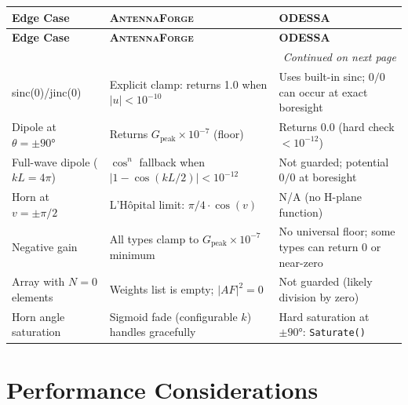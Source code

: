 \documentclass[11pt,a4paper]{article}
\newcommand{\AF}{\textsc{AntennaForge}}
\newcommand{\OD}{\textsc{ODESSA}}
\begin{document}
\begin{longtable}{p{3.5cm} p{5.5cm} p{5.5cm}}
\toprule
\textbf{Edge Case} & \textbf{\AF{}} & \textbf{\OD{}} \\
\midrule
\endfirsthead
\toprule
\textbf{Edge Case} & \textbf{\AF{}} & \textbf{\OD{}} \\
\midrule
\endhead
\midrule
\multicolumn{3}{r}{\itshape Continued on next page} \\
\bottomrule
\endfoot
\bottomrule
\endlastfoot

sinc(0)/jinc(0) &
  Explicit clamp: returns 1.0 when $|u| < 10^{-10}$ &
  Uses built-in sinc; $0/0$ can occur at exact boresight \\

Dipole at $\theta = \pm 90°$ &
  Returns $G_\text{peak} \times 10^{-7}$ (floor) &
  Returns 0.0 (hard check $< 10^{-12}$) \\

Full-wave dipole ($kL = 4\pi$) &
  $\cos^n$ fallback when $|1 - \cos(kL/2)| < 10^{-12}$ &
  Not guarded; potential $0/0$ at boresight \\

Horn at $v = \pm\pi/2$ &
  L'H\^{o}pital limit: $\pi/4 \cdot \cos(v)$ &
  N/A (no H-plane function) \\

Negative gain &
  All types clamp to $G_\text{peak} \times 10^{-7}$ minimum &
  No universal floor; some types can return 0 or near-zero \\

Array with $N = 0$ elements &
  Weights list is empty; $|AF|^2 = 0$ &
  Not guarded (likely division by zero) \\

Horn angle saturation &
  Sigmoid fade (configurable $k$) handles gracefully &
  Hard saturation at $\pm 90°$: \texttt{Saturate()} \\
\end{longtable}

\section{Performance Considerations}
\label{sec:perf}
\end{document}
